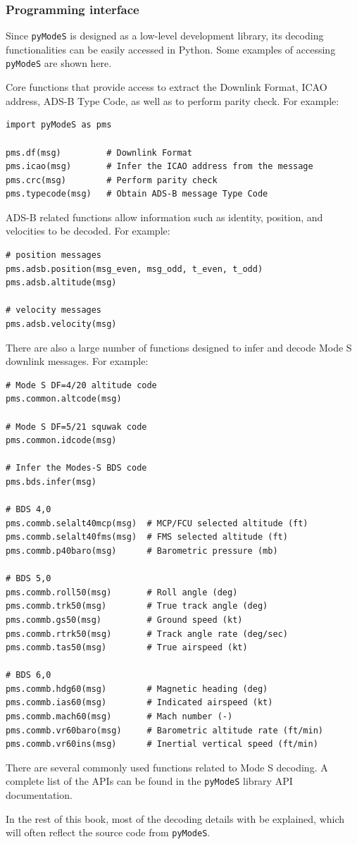 \subsubsection{Programming interface}

Since \texttt{pyModeS} is designed as a low-level development library, its decoding functionalities can be easily accessed in Python. Some examples of accessing \texttt{pyModeS} are shown here.

Core functions that provide access to extract the Downlink Format, ICAO address, ADS-B Type Code, as well as to perform parity check. For example:

\begin{verbatim}
import pyModeS as pms

pms.df(msg)         # Downlink Format
pms.icao(msg)       # Infer the ICAO address from the message
pms.crc(msg)        # Perform parity check
pms.typecode(msg)   # Obtain ADS-B message Type Code
\end{verbatim}


ADS-B related functions allow information such as identity, position, and velocities to be decoded. For example:

\begin{verbatim}
# position messages
pms.adsb.position(msg_even, msg_odd, t_even, t_odd)
pms.adsb.altitude(msg)

# velocity messages
pms.adsb.velocity(msg)
\end{verbatim}

There are also a large number of functions designed to infer and decode Mode S downlink messages. For example:

\begin{verbatim}
# Mode S DF=4/20 altitude code
pms.common.altcode(msg)

# Mode S DF=5/21 squwak code
pms.common.idcode(msg)

# Infer the Modes-S BDS code
pms.bds.infer(msg)

# BDS 4,0
pms.commb.selalt40mcp(msg)  # MCP/FCU selected altitude (ft)
pms.commb.selalt40fms(msg)  # FMS selected altitude (ft)
pms.commb.p40baro(msg)      # Barometric pressure (mb)

# BDS 5,0
pms.commb.roll50(msg)       # Roll angle (deg)
pms.commb.trk50(msg)        # True track angle (deg)
pms.commb.gs50(msg)         # Ground speed (kt)
pms.commb.rtrk50(msg)       # Track angle rate (deg/sec)
pms.commb.tas50(msg)        # True airspeed (kt)

# BDS 6,0
pms.commb.hdg60(msg)        # Magnetic heading (deg)
pms.commb.ias60(msg)        # Indicated airspeed (kt)
pms.commb.mach60(msg)       # Mach number (-)
pms.commb.vr60baro(msg)     # Barometric altitude rate (ft/min)
pms.commb.vr60ins(msg)      # Inertial vertical speed (ft/min)
\end{verbatim}

There are several commonly used functions related to Mode S decoding. A complete list of the APIs can be found in the \texttt{pyModeS} library API documentation.

In the rest of this book, most of the decoding details with be explained, which will often reflect the source code from \texttt{pyModeS}.
